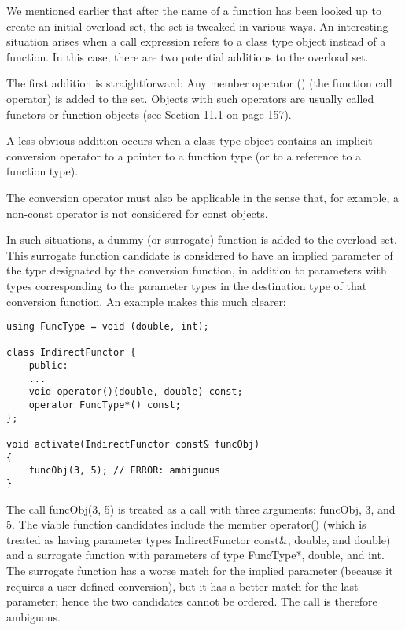 
We mentioned earlier that after the name of a function has been looked up to create an initial overload set, the set is tweaked in various ways. An interesting situation arises when a call expression refers to a class type object instead of a function. In this case, there are two potential additions to the overload set.

The first addition is straightforward: Any member operator () (the function call operator) is added to the set. Objects with such operators are usually called functors or function objects (see Section 11.1 on page 157).

A less obvious addition occurs when a class type object contains an implicit conversion operator to a pointer to a function type (or to a reference to a function type).

\begin{tcolorbox}[colback=webgreen!5!white,colframe=webgreen!75!black]
\hspace*{0.75cm}The conversion operator must also be applicable in the sense that, for example, a non-const operator is not considered for const objects.
\end{tcolorbox}

In such situations, a dummy (or surrogate) function is added to the overload set. This surrogate function candidate is considered to have an implied parameter of the type designated by the conversion function, in addition to parameters with types corresponding to the parameter types in the destination type of that conversion function. An example makes this much clearer:

\begin{lstlisting}[style=styleCXX]
using FuncType = void (double, int);

class IndirectFunctor {
	public:
	...
	void operator()(double, double) const;
	operator FuncType*() const;
};

void activate(IndirectFunctor const& funcObj)
{
	funcObj(3, 5); // ERROR: ambiguous
}
\end{lstlisting}

The call funcObj(3, 5) is treated as a call with three arguments: funcObj, 3, and 5. The viable function candidates include the member operator() (which is treated as having parameter types IndirectFunctor const\&, double, and double) and a surrogate function with parameters of type FuncType*, double, and int. The surrogate function has a worse match for the implied parameter (because it requires a user-defined conversion), but it has a better match for the last parameter; hence the two candidates cannot be ordered. The call is therefore ambiguous.

